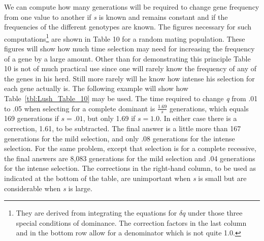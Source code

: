 We can compute how many generations will be required to change
gene frequency from one value to another if \textit{s} is known and remains
constant and if the frequencies of the different genotypes are known.
The figures necessary for such computations\footnote{They are derived
from integrating the equations for $\delta q$ under those three
special conditions of dominance. The correction factors in the last column and
in the bottom row allow for a denominator which is not quite 1.0.} are shown in Table 10 for
a random mating population. These figures will show how much time
selection may need for increasing the frequency of a gene by a large
amount. Other than for demonstrating this principle Table 10 is not of
much practical use since one will rarely know the frequency of any of
the genes in his herd. Still more rarely will he know how intense his
selection for each gene actually is. The following example will show
how Table~\ref{tbl:Lush_Table_10} may be used. The time required to change
\textit{q} from .01 to
.05 when selecting for a complete dominant is $\frac{1.69}{s}$
generations, which  equals 169 generations if $s = .01$, but only 1.69
if $s= 1.0$. In either case there is a correction, 1.61, to be subtracted.
The final answer is a little more than 167 generations for the mild selection,
and only .08 generations for the intense selection. For the same problem,
except that selection is for a complete recessive, the final answers are
8,083 generations for the mild selection and .04 generations for the intense
selection. The corrections in the right-hand column, to be used as indicated at the bottom
of the table, are unimportant when \textit{s} is small but are considerable
when \textit{s} is large.


